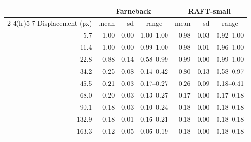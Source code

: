 \begin{tabular}{@{}rrrcrrc@{}}
\toprule
 & \multicolumn{3}{c}{Farneback} & \multicolumn{3}{c}{RAFT-small} \\
\cmidrule(lr){2-4}\cmidrule(lr){5-7}
Displacement (px) & mean & sd & range & mean & sd & range \\
\midrule
5.7 & 1.00 & 0.00 & 1.00--1.00 & 0.98 & 0.03 & 0.92--1.00 \\
11.4 & 1.00 & 0.00 & 0.99--1.00 & 0.98 & 0.01 & 0.96--1.00 \\
22.8 & 0.88 & 0.14 & 0.58--0.99 & 0.99 & 0.00 & 0.99--1.00 \\
34.2 & 0.25 & 0.08 & 0.14--0.42 & 0.80 & 0.13 & 0.58--0.97 \\
45.5 & 0.21 & 0.03 & 0.17--0.27 & 0.26 & 0.09 & 0.18--0.41 \\
68.0 & 0.20 & 0.03 & 0.13--0.27 & 0.17 & 0.00 & 0.17--0.18 \\
90.1 & 0.18 & 0.03 & 0.10--0.24 & 0.18 & 0.00 & 0.18--0.18 \\
132.9 & 0.18 & 0.01 & 0.16--0.21 & 0.18 & 0.00 & 0.18--0.18 \\
163.3 & 0.12 & 0.05 & 0.06--0.19 & 0.18 & 0.00 & 0.18--0.18 \\
\bottomrule
\end{tabular}
